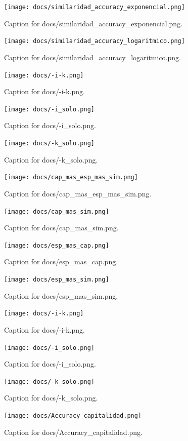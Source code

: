 \documentclass{article}
\begin{document}
\begin{figure}[h] \centering \texttt{[image: docs/similaridad\_accuracy\_exponencial.png]} \caption{Caption for docs/similaridad_accuracy_exponencial.png.} \end{figure}
\begin{figure}[h] \centering \texttt{[image: docs/similaridad\_accuracy\_logaritmico.png]} \caption{Caption for docs/similaridad_accuracy_logaritmico.png.} \end{figure}
\begin{figure}[h] \centering \texttt{[image: docs/-i-k.png]} \caption{Caption for docs/-i-k.png.} \end{figure}
\begin{figure}[h] \centering \texttt{[image: docs/-i\_solo.png]} \caption{Caption for docs/-i_solo.png.} \end{figure}
\begin{figure}[h] \centering \texttt{[image: docs/-k\_solo.png]} \caption{Caption for docs/-k_solo.png.} \end{figure}
\begin{figure}[h] \centering \texttt{[image: docs/cap\_mas\_esp\_mas\_sim.png]} \caption{Caption for docs/cap_mas_esp_mas_sim.png.} \end{figure}
\begin{figure}[h] \centering \texttt{[image: docs/cap\_mas\_sim.png]} \caption{Caption for docs/cap_mas_sim.png.} \end{figure}
\begin{figure}[h] \centering \texttt{[image: docs/esp\_mas\_cap.png]} \caption{Caption for docs/esp_mas_cap.png.} \end{figure}
\begin{figure}[h] \centering \texttt{[image: docs/esp\_mas\_sim.png]} \caption{Caption for docs/esp_mas_sim.png.} \end{figure}
\begin{figure}[h] \centering \texttt{[image: docs/-i-k.png]} \caption{Caption for docs/-i-k.png.} \end{figure}
\begin{figure}[h] \centering \texttt{[image: docs/-i\_solo.png]} \caption{Caption for docs/-i_solo.png.} \end{figure}
\begin{figure}[h] \centering \texttt{[image: docs/-k\_solo.png]} \caption{Caption for docs/-k_solo.png.} \end{figure}
\begin{figure}[h] \centering \texttt{[image: docs/Accuracy\_capitalidad.png]} \caption{Caption for docs/Accuracy_capitalidad.png.} \end{figure}
\end{document}
